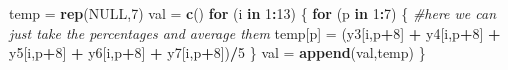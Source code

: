 \documentclass[
]{article}
\newenvironment{Shaded}{\begin{snugshade}}{\end{snugshade}}
\newcommand{\CommentTok}[1]{\textcolor[rgb]{0.56,0.35,0.01}{\textit{#1}}}
\newcommand{\ControlFlowTok}[1]{\textcolor[rgb]{0.13,0.29,0.53}{\textbf{#1}}}
\newcommand{\DecValTok}[1]{\textcolor[rgb]{0.00,0.00,0.81}{#1}}
\newcommand{\KeywordTok}[1]{\textcolor[rgb]{0.13,0.29,0.53}{\textbf{#1}}}
\newcommand{\NormalTok}[1]{#1}
\newcommand{\OperatorTok}[1]{\textcolor[rgb]{0.81,0.36,0.00}{\textbf{#1}}}
\newcommand{\OtherTok}[1]{\textcolor[rgb]{0.56,0.35,0.01}{#1}}
\newcommand{\StringTok}[1]{\textcolor[rgb]{0.31,0.60,0.02}{#1}}
\begin{document}
\begin{Shaded}
\begin{Highlighting}[]
\NormalTok{temp =}\StringTok{ }\KeywordTok{rep}\NormalTok{(}\OtherTok{NULL}\NormalTok{,}\DecValTok{7}\NormalTok{)}
\NormalTok{val =}\StringTok{ }\KeywordTok{c}\NormalTok{()}
\ControlFlowTok{for}\NormalTok{ (i }\ControlFlowTok{in} \DecValTok{1}\OperatorTok{:}\DecValTok{13}\NormalTok{)}
\NormalTok{\{}
  \ControlFlowTok{for}\NormalTok{ (p }\ControlFlowTok{in} \DecValTok{1}\OperatorTok{:}\DecValTok{7}\NormalTok{)}
\NormalTok{  \{}
    \CommentTok{#here we can just take the percentages and average them}
\NormalTok{    temp[p] =}\StringTok{ }\NormalTok{(y3[i,p}\OperatorTok{+}\DecValTok{8}\NormalTok{] }\OperatorTok{+}\StringTok{ }\NormalTok{y4[i,p}\OperatorTok{+}\DecValTok{8}\NormalTok{] }\OperatorTok{+}\StringTok{ }\NormalTok{y5[i,p}\OperatorTok{+}\DecValTok{8}\NormalTok{] }\OperatorTok{+}\StringTok{ }\NormalTok{y6[i,p}\OperatorTok{+}\DecValTok{8}\NormalTok{] }\OperatorTok{+}\StringTok{ }\NormalTok{y7[i,p}\OperatorTok{+}\DecValTok{8}\NormalTok{])}\OperatorTok{/}\DecValTok{5}
\NormalTok{  \}}
\NormalTok{  val =}\StringTok{ }\KeywordTok{append}\NormalTok{(val,temp)}
\NormalTok{\}}


\end{Highlighting}
\end{Shaded}
\end{document}
